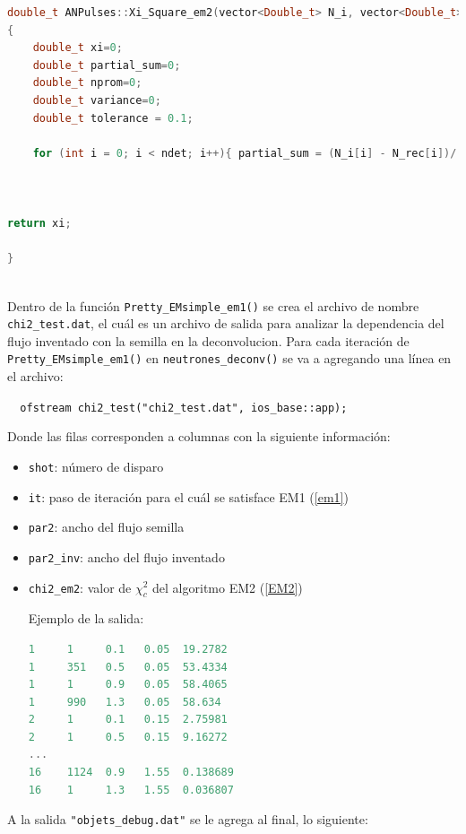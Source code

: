 \documentclass[11pt,letterpaper]{article}
\begin{document}
\begin{lstlisting}[language=c++]
double_t ANPulses::Xi_Square_em2(vector<Double_t> N_i, vector<Double_t> N_rec, double_t intgl, double ndet)
{
	double_t xi=0;
	double_t partial_sum=0;
	double_t nprom=0;
	double_t variance=0;
	double_t tolerance = 0.1;

	for (int i = 0; i < ndet; i++){ partial_sum = (N_i[i] - N_rec[i])/(intgl*tolerance); xi += partial_sum*partial_sum; }
	


return xi;
	
}	
	
\end{lstlisting}

Dentro de la función \verb|Pretty_EMsimple_em1()| se crea el archivo de nombre \verb|chi2_test.dat|, el cuál es un archivo de salida para analizar la dependencia del flujo inventado con la semilla en la deconvolucion. Para cada iteración de \verb|Pretty_EMsimple_em1()| en \verb|neutrones_deconv()| se va a agregando una línea en el archivo:

\verb|	ofstream chi2_test("chi2_test.dat", ios_base::app);|

Donde las filas corresponden a columnas con la siguiente información:

\begin{itemize}

\item[•] \verb|shot|: número de disparo
\item[•] \verb|it|: paso de iteración para el cuál se satisface EM1 (\ref{em1})
\item[•] \verb|par2|: ancho del flujo semilla 
\item[•] \verb|par2_inv|: ancho del flujo inventado
\item[•] \verb|chi2_em2|: valor de $\chi_c^2$ del algoritmo EM2 (\ref{EM2})

Ejemplo de la salida:


\begin{lstlisting}[language=c++]
1     1     0.1   0.05  19.2782
1     351   0.5   0.05  53.4334
1     1     0.9   0.05  58.4065
1     990   1.3   0.05  58.634
2     1     0.1   0.15  2.75981
2     1     0.5   0.15  9.16272
...
16    1124  0.9   1.55  0.138689
16    1     1.3   1.55  0.036807
\end{lstlisting}


\end{itemize}


A la salida \verb|"objets_debug.dat"| se le agrega al final, lo siguiente:
\end{document}
